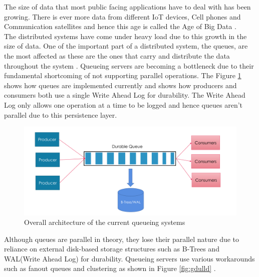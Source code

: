 \documentclass[12pt,a4paper]{article}
\begin{document}
 The size of data that most public facing applications have to deal with has been growing. There is ever more data from different IoT devices, Cell phones and Communication satellites and hence this age is called the Age of Big Data \citep{10333611920150101} \citep{lohr2012age}.\\
 
 
 The distributed systems have come under heavy load due to this growth in the size of data. One of the important part of a distributed system, the queues, are the most affected as these are the ones that carry and distribute the data throughout the system \citep{lamport1978time}. Queueing servers are becoming a bottleneck due to their fundamental shortcoming of not supporting parallel operations. The Figure \ref{fig:gull} shows how queues are implemented currently and shows how producers and consumers both use a single Write Ahead Log for durability. The Write Ahead Log only allows one operation at a time to be logged and hence queues aren't parallel due to this persistence layer.\\ 
 
 \begin{figure}[!htb]
 	\centering
 	\textbf{}\par\medskip
 	\includegraphics[scale=0.6]{1}
 	\caption{Overall architecture of the current queueing systems}
 	\label{fig:gull}
 \end{figure}
 
 

    
 Although queues are parallel in theory, they lose their parallel nature due to reliance on external disk-based storage structures such as B-Trees and WAL(Write Ahead Log) for durability. Queueing servers use various workarounds such as fanout queues and clustering as shown in Figure \ref{fig:gdulld} \citep{albrecht2013making}.\\

 
 
\end{document}
